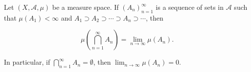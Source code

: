 Let $(X, \mathcal{A}, \mu)$ be a measure space. If $(A_n)_{n=1}^{\infty}$ is a sequence of sets in $\mathcal{A}$ such that $\mu(A_1) < \infty$ and $A_1 \supset A_2 \supset \cdots \supset A_n \supset \cdots$, then

$$\mu\left(\bigcap_{n=1}^{\infty} A_n\right) = \lim_{n \to \infty} \mu(A_n).$$

In particular, if $\bigcap_{n=1}^{\infty} A_n = \emptyset$, then $\lim_{n \to \infty} \mu(A_n) = 0.$